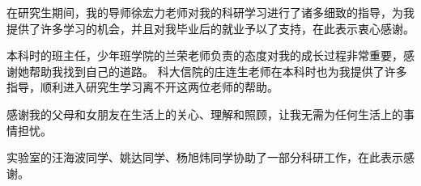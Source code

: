 
\begin{acknowledgements}

在研究生期间，我的导师徐宏力老师对我的科研学习进行了诸多细致的指导，为我提供了许多学习的机会，并且对我毕业后的就业予以了支持，在此表示衷心感谢。

本科时的班主任，少年班学院的兰荣老师负责的态度对我的成长过程非常重要，感谢她帮助我找到自己的道路。
科大信院的庄连生老师在本科时也为我提供了许多指导，顺利进入研究生学习离不开这两位老师的帮助。

感谢我的父母和女朋友在生活上的关心、理解和照顾，让我无需为任何生活上的事情担忧。

实验室的汪海波同学、姚达同学、杨旭炜同学协助了一部分科研工作，在此表示感谢。

\end{acknowledgements}
